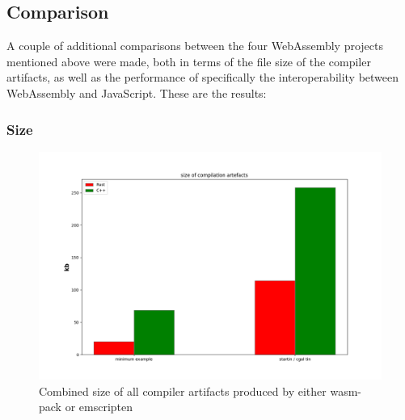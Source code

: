 

\subsection{Comparison}

A couple of additional comparisons between the four WebAssembly projects mentioned above were made, both in terms of the file size of the compiler artifacts, as well as the performance of specifically the interoperability between WebAssembly and JavaScript. 
These are the results:

\subsubsection*{Size}

\begin{figure}
  \graphicspath{{../../assets/plots/rust-cpp-performance/}}
  \centering
  \includegraphics[width=\linewidth]{figure.png}
  \caption[]{Combined size of all compiler artifacts produced by either wasm-pack or emscripten}
  \label{fig:rust-cpp-compilation}
\end{figure}

